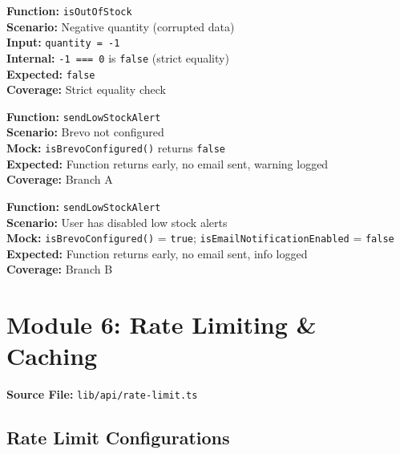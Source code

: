 \documentclass[12pt,a4paper]{report}
\newcommand{\pone}{\textbf{\color{p1red}P1}}
\newcommand{\ptwo}{\textbf{\color{p2orange}P2}}
\begin{document}
\begin{tcolorbox}[testbox, title={EMAIL-009 \hfill \ptwo}]
\textbf{Function:} \texttt{isOutOfStock} \\
\textbf{Scenario:} Negative quantity (corrupted data) \\
\textbf{Input:} \texttt{quantity = -1} \\
\textbf{Internal:} \texttt{-1 === 0} is \texttt{false} (strict equality) \\
\textbf{Expected:} \texttt{false} \\
\textbf{Coverage:} Strict equality check
\end{tcolorbox}

\begin{tcolorbox}[testbox, title={EMAIL-010 \hfill \pone}]
\textbf{Function:} \texttt{sendLowStockAlert} \\
\textbf{Scenario:} Brevo not configured \\
\textbf{Mock:} \texttt{isBrevoConfigured()} returns \texttt{false} \\
\textbf{Expected:} Function returns early, no email sent, warning logged \\
\textbf{Coverage:} Branch A
\end{tcolorbox}

\begin{tcolorbox}[testbox, title={EMAIL-011 \hfill \ptwo}]
\textbf{Function:} \texttt{sendLowStockAlert} \\
\textbf{Scenario:} User has disabled low stock alerts \\
\textbf{Mock:} \texttt{isBrevoConfigured()} = \texttt{true}; \texttt{isEmailNotificationEnabled} = \texttt{false} \\
\textbf{Expected:} Function returns early, no email sent, info logged \\
\textbf{Coverage:} Branch B
\end{tcolorbox}

\chapter{Module 6: Rate Limiting \& Caching}

\textbf{Source File:} \texttt{lib/api/rate-limit.ts}

\section{Rate Limit Configurations}
\end{document}
